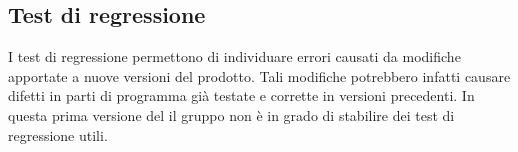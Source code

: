 \subsection{Test di regressione}
I test di regressione permettono di individuare errori causati da modifiche apportate a nuove versioni del prodotto. Tali modifiche potrebbero infatti causare difetti in parti di programma già testate e corrette in versioni precedenti. 
In questa prima versione del \PdQv{} il gruppo non è in grado di stabilire dei test di regressione utili.
